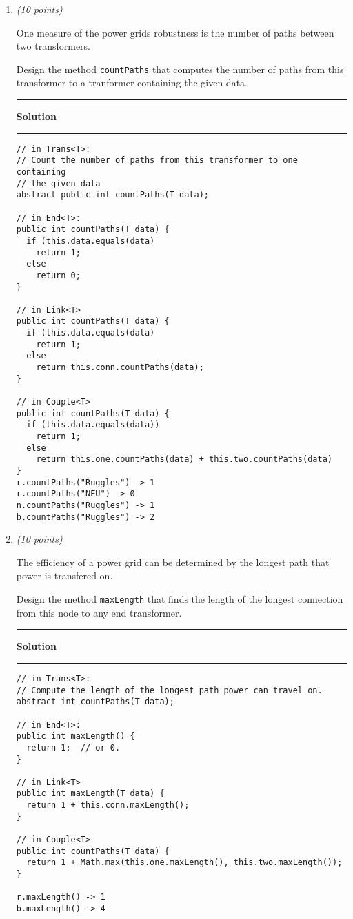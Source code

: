 \documentclass[11pt]{article}
\def\thel{\noindent\rule{2.5cm}{.5pt}}
\def\begsol#1{\thel {\bf Solution} \thel}\def\endsol{\relax}
\newcounter{Pctr}
\newenvironment{problem}{\stepcounter{Pctr}%
\begin{description}
\item[\noindent{\bf Problem} \arabic{Pctr}] 
\end{description}}{\relax}
\begin{document}
\begin{problem}
\begin{enumerate}
\newpage
\item {\em{(10 points)}}

One measure of the power grids robustness is the number of paths 
between two transformers.

Design the method {\tt countPaths} that computes the number of paths
from this transformer to a tranformer containing the given data.

\begsol{\vspace{0.5in}}

\begin{verbatim}
// in Trans<T>:
// Count the number of paths from this transformer to one containing 
// the given data
abstract public int countPaths(T data);

// in End<T>:
public int countPaths(T data) {
  if (this.data.equals(data)
    return 1;
  else 
    return 0;
}

// in Link<T>
public int countPaths(T data) {
  if (this.data.equals(data)
    return 1;
  else 
    return this.conn.countPaths(data);
}

// in Couple<T>
public int countPaths(T data) {
  if (this.data.equals(data))
    return 1;
  else
    return this.one.countPaths(data) + this.two.countPaths(data)
}
r.countPaths("Ruggles") -> 1
r.countPaths("NEU") -> 0
n.countPaths("Ruggles") -> 1
b.countPaths("Ruggles") -> 2
\end{verbatim}
\endsol

\newpage
\item {\em{(10 points)}}

The efficiency of a power grid can be determined by the longest path
that power is transfered on.

Design the method {\tt maxLength} that finds the length of the longest
connection from this node to any end transformer.

\begsol{\vspace{0.5in}}
\begin{verbatim}
// in Trans<T>:
// Compute the length of the longest path power can travel on.
abstract int countPaths(T data);

// in End<T>:
public int maxLength() {
  return 1;  // or 0.
}

// in Link<T>
public int maxLength(T data) {
  return 1 + this.conn.maxLength();
}

// in Couple<T>
public int countPaths(T data) {
  return 1 + Math.max(this.one.maxLength(), this.two.maxLength());
}

r.maxLength() -> 1
b.maxLength() -> 4
\end{verbatim}
\endsol

\newpage
\end{enumerate}
\end{problem}
\end{document}
